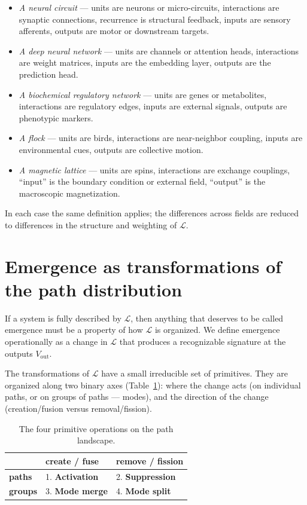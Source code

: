 \documentclass[11pt,a4paper]{article}
\begin{document}
\begin{itemize}[leftmargin=*]
  \item \emph{A neural circuit} --- units are neurons or
  micro-circuits, interactions are synaptic connections, recurrence
  is structural feedback, inputs are sensory afferents, outputs are
  motor or downstream targets.
  \item \emph{A deep neural network} --- units are channels or
  attention heads, interactions are weight matrices, inputs are the
  embedding layer, outputs are the prediction head.
  \item \emph{A biochemical regulatory network} --- units are genes
  or metabolites, interactions are regulatory edges, inputs are
  external signals, outputs are phenotypic markers.
  \item \emph{A flock} --- units are birds, interactions are
  near-neighbor coupling, inputs are environmental cues, outputs
  are collective motion.
  \item \emph{A magnetic lattice} --- units are spins, interactions
  are exchange couplings, ``input'' is the boundary condition or
  external field, ``output'' is the macroscopic magnetization.
\end{itemize}

In each case the same definition applies; the differences across
fields are reduced to differences in the structure and weighting
of $\mathcal{L}$.

\section{Emergence as transformations of the path distribution}

If a system is fully described by $\mathcal{L}$, then anything that
deserves to be called emergence must be a property of how
$\mathcal{L}$ is organized. We define emergence operationally as a
change in $\mathcal{L}$ that produces a recognizable signature at
the outputs $V_{\text{out}}$.

The transformations of $\mathcal{L}$ have a small irreducible set of
primitives. They are organized along two binary axes (Table~\ref{tab:axes}):
where the change acts (on individual paths, or on groups of paths
--- modes), and the direction of the change (creation/fusion versus
removal/fission).

\begin{table}[h]
\centering
\renewcommand{\arraystretch}{1.25}
\begin{tabular}{lll}
\toprule
 & \textbf{create / fuse} & \textbf{remove / fission}\\
\midrule
\textbf{paths}  & 1. \textbf{Activation} & 2. \textbf{Suppression} \\
\textbf{groups} & 3. \textbf{Mode merge} & 4. \textbf{Mode split} \\
\bottomrule
\end{tabular}
\caption{The four primitive operations on the path landscape.}
\label{tab:axes}
\end{table}
\end{document}
